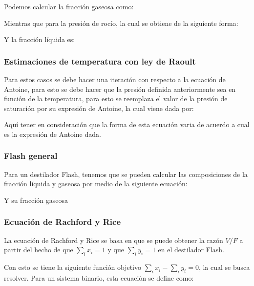 Podemos calcular la fracción gaseosa como:


Mientras que para la presión de rocío, la cual se obtiene de la siguiente forma:


Y la fracción líquida es:
\subsubsection{Estimaciones de temperatura con ley de Raoult}

Para estos casos se debe hacer una iteración con respecto a la ecuación de Antoine, para esto se debe hacer que la presión definida anteriormente sea
en función de la temperatura, para esto se reemplaza el valor de la presión de saturación por su expresión de Antoine, la cual viene dada por:


Aquí tener en consideración que la forma de esta ecuación varia de acuerdo a cual es la expresión de Antoine dada.

\subsubsection{Flash general}

Para un destilador Flash, tenemos que se pueden calcular las composiciones de la fracción líquida y gaseosa por medio de la siguiente ecuación:


Y su fracción gaseosa


\subsubsection{Ecuación de Rachford y Rice}

La ecuación de Rachford y Rice se basa en que se puede obtener la razón $V/F$ a partir del hecho de que $\sum_i  x_i=1$ y que $\sum_i y_i=1$ en el destilador Flash.

Con esto se tiene la siguiente función objetivo $\sum_i x_i - \sum_i y_i = 0$, la cual se busca resolver. Para un sistema binario, esta ecuación se define como:

